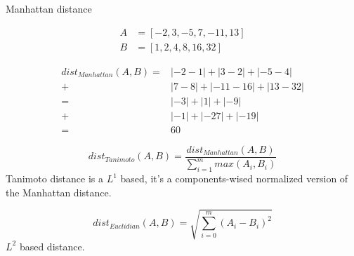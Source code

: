 \begin{example}
  \centering
  \caption{Manhattan distance}
  \label{ex:manhattan}

  \begin{subexample}{\linewidth}
    \begin{equation*}
      \begin{aligned}
        A &= \left[-2, 3, -5, 7, -11, 13 \right] \\
        B &= \left[1, 2, 4, 8, 16, 32 \right]
      \end{aligned}
    \end{equation*}
  \end{subexample}

  \vspace{0.5cm}

  \begin{subexample}{\linewidth}
    \begin{equation*}
      \begin{aligned}
        dist_{Manhattan}(A, B) =& |-2 - 1| + |3 - 2| + |-5 - 4| \\
                               +& |7 - 8| + |-11 - 16| + |13 - 32| \\
                               =& |-3| + |1| + |-9| \\
                               +& |-1| + |-27| + |-19| \\
                               =& 60
      \end{aligned}
    \end{equation*}
  \end{subexample}
\end{example}

\begin{definition}
  \begin{equation}
    dist_{Tanimoto}(A, B) = \frac{dist_{Manhattan}(A, B)}{\sum_{i=1}^{m} max(A_i, B_i)}
  \end{equation}
  Tanimoto distance is a $L^1$ based, it's a components-wised normalized version of the Manhattan distance.
\end{definition}

\begin{definition}
  \begin{equation}
    dist_{Euclidian}(A, B) = \sqrt{\sum_{i=0}^{m}(A_i - B_i)^2}
  \end{equation}
  $L^2$ based distance.
\end{definition}

